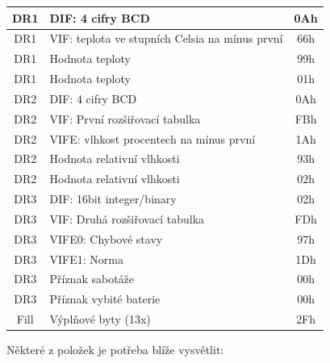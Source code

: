 \begin{table}[!ht]
{\begin{tabular}{|c|l|c|}
DR1                & DIF: 4 cifry BCD                               & 0Ah              \\ \hline
DR1                & VIF: teplota ve stupních Celsia na mínus první & 66h              \\ \hline
DR1                & Hodnota teploty                                & 99h              \\ \hline
DR1                & Hodnota teploty                                & 01h              \\ \hline
DR2                & DIF: 4 cifry BCD                               & 0Ah              \\ \hline
DR2                & VIF: První rozšiřovací tabulka                 & FBh              \\ \hline
DR2                & VIFE: vlhkost procentech na mínus první        & 1Ah              \\ \hline
DR2                & Hodnota relativní vlhkosti                               & 93h              \\ \hline
DR2                & Hodnota relativní vlhkosti                               & 02h              \\ \hline
DR3                & DIF: 16bit integer/binary                      & 02h              \\ \hline
DR3                & VIF: Druhá rozšiřovací tabulka                 & FDh              \\ \hline
DR3                & VIFE0: Chybové stavy                           & 97h              \\ \hline
DR3                & VIFE1: Norma 																	& 1Dh              \\ \hline
DR3                & Příznak sabotáže                               & 00h              \\ \hline
DR3                & Příznak vybité baterie                         & 00h              \\ \hline
Fill               & Výplňové byty (13x)                                 & 2Fh              \\ \hline

\end{tabular}}
\end{table}

\newpage{}

Některé z položek je potřeba blíže vysvětlit:

